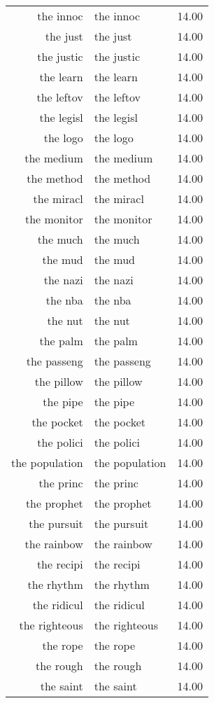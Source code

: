 \begin{table}[ht]
\begin{tabular}{rlr}
  the innoc & the innoc & 14.00 \\ 
  the just & the just & 14.00 \\ 
  the justic & the justic & 14.00 \\ 
  the learn & the learn & 14.00 \\ 
  the leftov & the leftov & 14.00 \\ 
  the legisl & the legisl & 14.00 \\ 
  the logo & the logo & 14.00 \\ 
  the medium & the medium & 14.00 \\ 
  the method & the method & 14.00 \\ 
  the miracl & the miracl & 14.00 \\ 
  the monitor & the monitor & 14.00 \\ 
  the much & the much & 14.00 \\ 
  the mud & the mud & 14.00 \\ 
  the nazi & the nazi & 14.00 \\ 
  the nba & the nba & 14.00 \\ 
  the nut & the nut & 14.00 \\ 
  the palm & the palm & 14.00 \\ 
  the passeng & the passeng & 14.00 \\ 
  the pillow & the pillow & 14.00 \\ 
  the pipe & the pipe & 14.00 \\ 
  the pocket & the pocket & 14.00 \\ 
  the polici & the polici & 14.00 \\ 
  the population & the population & 14.00 \\ 
  the princ & the princ & 14.00 \\ 
  the prophet & the prophet & 14.00 \\ 
  the pursuit & the pursuit & 14.00 \\ 
  the rainbow & the rainbow & 14.00 \\ 
  the recipi & the recipi & 14.00 \\ 
  the rhythm & the rhythm & 14.00 \\ 
  the ridicul & the ridicul & 14.00 \\ 
  the righteous & the righteous & 14.00 \\ 
  the rope & the rope & 14.00 \\ 
  the rough & the rough & 14.00 \\ 
  the saint & the saint & 14.00 \\ 

\end{tabular}
\end{table}
